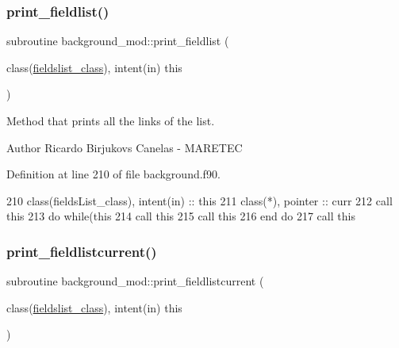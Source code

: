 \subsubsection{\texorpdfstring{print\+\_\+fieldlist()}{print\_fieldlist()}}
{\footnotesize\ttfamily subroutine background\+\_\+mod\+::print\+\_\+fieldlist (\begin{DoxyParamCaption}\item[{class(\mbox{\hyperlink{structbackground__mod_1_1fieldslist__class}{fieldslist\+\_\+class}}), intent(in)}]{this }\end{DoxyParamCaption})\hspace{0.3cm}{\ttfamily [private]}}



Method that prints all the links of the list. 

\begin{DoxyAuthor}{Author}
Ricardo Birjukovs Canelas -\/ M\+A\+R\+E\+T\+EC 
\end{DoxyAuthor}


Definition at line 210 of file background.\+f90.


\begin{DoxyCode}
210     \textcolor{keywordtype}{class}(fieldsList\_class), \textcolor{keywordtype}{intent(in)} :: this
211     \textcolor{keywordtype}{class}(*), \textcolor{keywordtype}{pointer} :: curr
212     \textcolor{keyword}{call }this%
213     \textcolor{keywordflow}{do} \textcolor{keywordflow}{while}(this%
214         \textcolor{keyword}{call }this%
215         \textcolor{keyword}{call }this%
216 \textcolor{keywordflow}{    end do}
217     \textcolor{keyword}{call }this%
\end{DoxyCode}
\mbox{\label{namespacebackground__mod_a2bd18f3830c0667741efd086d36753db}} 
\subsubsection{\texorpdfstring{print\+\_\+fieldlistcurrent()}{print\_fieldlistcurrent()}}
{\footnotesize\ttfamily subroutine background\+\_\+mod\+::print\+\_\+fieldlistcurrent (\begin{DoxyParamCaption}\item[{class(\mbox{\hyperlink{structbackground__mod_1_1fieldslist__class}{fieldslist\+\_\+class}}), intent(in)}]{this }\end{DoxyParamCaption})\hspace{0.3cm}{\ttfamily [private]}}



